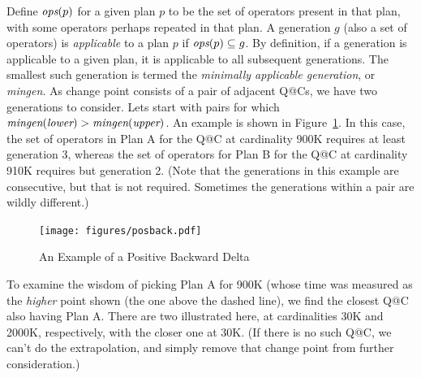 \documentclass[prodmode,acmtods]{acmsmall}
\begin{document}
Define $\hbox{\em ops}(p)$ for a given plan $p$ to be the set of operators
present in that plan, with some operators perhaps repeated in that plan. 
A generation $g$ (also a set of operators) is {\em applicable} to a plan $p$ if
$\hbox{\em ops}(p) \subseteq g$. By
definition, if a generation is applicable to a given plan, it is
applicable to all subsequent generations. The smallest such generation is
termed the {\em minimally applicable generation}, or {\em mingen}.
As change point consists of a pair of adjacent Q@Cs, we have two generations
to consider. Lets start with pairs for which $\hbox{\em
mingen}(\hbox{\em lower}) > \hbox{\em mingen}(\hbox{\em
  upper})$. An example is shown in Figure~\ref{fig:posback}. In this case,
the set of operators in Plan A for the Q@C at cardinality 900K requires at
least generation 3, whereas the set of operators for Plan B for the Q@C at
cardinality 910K requires but generation 2. (Note that the generations in
this example
are consecutive, but that is not required. Sometimes the generations within a
pair are wildly different.)

\begin{figure}[t]
\texttt{[image: figures/posback.pdf]}
\caption{An Example of a Positive Backward Delta\label{fig:posback}}
\end{figure}

To examine the wisdom of picking Plan A for 900K (whose time was measured as
the {\em higher} point shown (the one above the dashed line), we find the closest Q@C
also having Plan A. There are two illustrated here, at cardinalities 30K and
2000K, respectively, with the closer one at 30K. (If there is no such Q@C,
we can't do the extrapolation, and simply remove that change point from
further consideration.)
\end{document}
